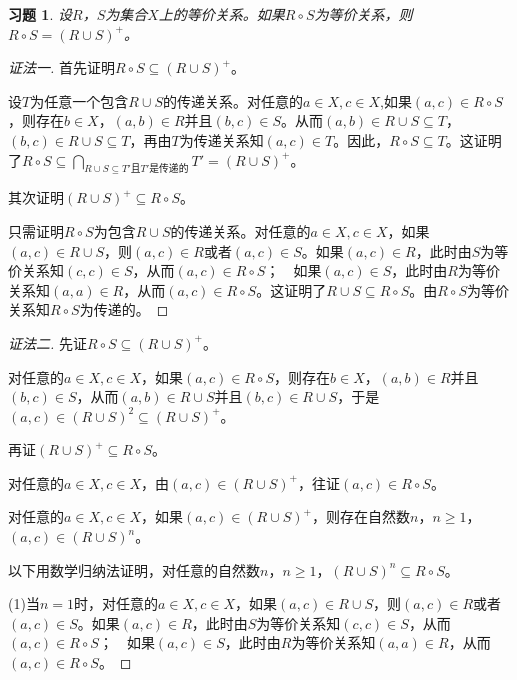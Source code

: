 \documentclass{article}
\begin{document}
\begin{CJK}{UTF8}{gbsn}
\newtheorem*{Exercise}{习题}
\begin{Exercise}
    设$R$，$S$为集合$X$上的等价关系。如果$R\circ S$为等价关系，则$R\circ S= (R\cup S)^+$。    
      \end{Exercise}
      \begin{proof}[证法一]
        首先证明$R\circ S\subseteq (R\cup S)^+$。

        设$T$为任意一个包含$R\cup S$的传递关系。对任意的$a\in X,c\in X$,如果$(a,c)\in R\circ S$，则存在$b\in X$，$(a,b)\in R$并且$(b,c)\in S$。从而$(a,b)\in R\cup S \subseteq T$，$(b,c)\in R\cup S \subseteq T$，再由$T$为传递关系知$(a,c)\in T$。因此，$R\circ S\subseteq T$。这证明了$R\circ S \subseteq \bigcap_{R\cup S\subseteq T'\text{且} T'\text{是传递的}}T'=(R\cup S)^+$。
      
        其次证明$(R\cup S)^+\subseteq R \circ S$。

        只需证明$R\circ S$为包含$R\cup S$的传递关系。对任意的$a\in X,c\in X$，如果$(a,c)\in R\cup S$，则$(a,c)\in R$或者$(a,c)\in S$。如果$(a,c)\in R$，此时由$S$为等价关系知$(c,c)\in S$，从而$(a,c)\in R\circ S$；　如果$(a,c)\in S$，此时由$R$为等价关系知$(a,a)\in R$，从而$(a,c)\in R\circ S$。这证明了$R\cup S\subseteq R\circ S$。由$R\circ S$为等价关系知$R\circ S$为传递的。
      
        
      \end{proof}
      
      \begin{proof}[证法二]
        先证$R\circ S\subseteq (R\cup S)^+$。
      
        对任意的$a\in X,c\in X$，如果$(a,c)\in R\circ S$，则存在$b\in X$，$(a,b)\in R$并且$(b,c)\in S$，从而$(a,b)\in R\cup S$并且$(b,c)\in R\cup S$，于是$(a,c)\in (R\cup S)^2 \subseteq (R\cup S)^+$。
      
        再证$(R\cup S)^+\subseteq R\circ S$。
      
        对任意的$a\in X,c\in X$，由$(a,c)\in (R\cup S)^+$，往证$(a,c)\in R\circ S$。
      
        对任意的$a\in X,c\in X$，如果$(a,c)\in (R\cup S)^+$，则存在自然数$n$，$n\geq 1$，　$(a,c)\in (R\cup S)^n$。
      
        以下用数学归纳法证明，对任意的自然数$n$，$n\geq 1$，$(R\cup S)^n\subseteq R\circ S$。
      
        (1)当$n=1$时，对任意的$a\in X,c\in X$，如果$(a,c)\in R\cup S$，则$(a,c)\in R$或者$(a,c)\in S$。如果$(a,c)\in R$，此时由$S$为等价关系知$(c,c)\in S$，从而$(a,c)\in R\circ S$；　如果$(a,c)\in S$，此时由$R$为等价关系知$(a,a)\in R$，从而$(a,c)\in R\circ S$。
      

\end{proof}
\end{CJK}
\end{document}
